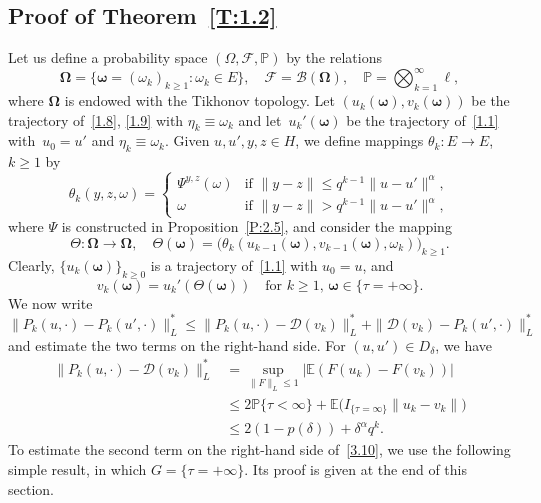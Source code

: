 \documentclass[11pt]{article}
\theoremstyle{plain}
\theoremstyle{definition}
\let\mathcal\mathscr
\theoremstyle{plain}
\numberwithin{equation}{section}
\newcommand{\IP}{{\mathbb P}}
\newcommand{\E}{{\mathbb E}}
\newcommand{\OOmega}{{\boldsymbol\Omega}}
\newcommand{\oomega}{{\boldsymbol\omega}}
\newcommand{\BB}{{\mathcal B}}
\newcommand{\DD}{{\mathcal D}}
\newcommand{\FF}{{\mathcal F}}
\begin{document}
\subsection{Proof of Theorem~\ref{T:1.2}}
\label{s3.2}
Let us define a probability space $(\Omega,\FF,\IP)$ by the relations\vspace*{-3pt}
\[
\OOmega=\{\oomega=(\omega_k)_{k\ge1}:\omega_k\in E\}, \quad
\FF=\BB(\OOmega),\quad \IP=\bigotimes_{k=1}^\infty\ell,
\]
where $\OOmega$ is endowed with the Tikhonov topology.
Let $(u_k(\oomega), v_k(\oomega))$ be the trajectory of~\eqref{1.8}, \eqref{1.9} with $\eta_k\equiv\omega_k$ and let~$u_k'(\oomega)$ be the trajectory of~\eqref{1.1} with~$u_0=u'$ and $\eta_k\equiv\omega_k$. Given $u,u',y,z\in H$, we define mappings $\theta_k:E\to E$, $k\ge1$ by\vspace*{-3pt}
\begin{equation} \label{3.08}
\theta_k(y,z,\omega)
=
\begin{cases}
\varPsi^{y,z}(\omega)
&\text{if } \|y-z\|
\le q^{k-1}\|u-u'\|^\alpha,\\[3pt]
\omega &\text{if } \|y-z\|
> q^{k-1}\|u-u'\|^\alpha,
\end{cases}
\end{equation}
where $\Psi$ is constructed in Proposition~\ref{P:2.5}, and consider the mapping
\[
\Theta:\OOmega\to\OOmega,\quad
\Theta(\oomega)
=\bigl(\theta_k(u_{k-1}(\oomega),v_{k-1}(\oomega),\omega_k)\bigr)_{k\ge1}.
\]
Clearly, $\{u_k(\oomega)\}_{k\ge0}$ is a trajectory of~\eqref{1.1} with $u_0=u$, and
\begin{equation} \label{3.09}
v_k(\oomega)=u_k'(\Theta(\oomega))\quad
\text{for $k\ge1$, $\oomega\in\{\tau=+\infty\}$}.
\end{equation}
We now write\vspace*{-3pt}
\begin{equation} \label{3.10}
\|P_k(u,\cdot)-P_k(u',\cdot)\|_L^*
\le \|P_k(u,\cdot)-\DD(v_k)\|_L^*+\|\DD(v_k)-P_k(u',\cdot)\|_L^*
\end{equation}
and estimate the two terms on the right-hand side. For $(u,u')\in D_\delta$, we have\vspace*{-3pt}
\begin{equation}\label{3.011}
\begin{aligned}
\|P_k(u,\cdot)-\DD(v_k)\|_L^*
&=\sup_{\|F\|_L\le1}\bigl|\E(F(u_k)-F(v_k))\bigr|\\
&\le2\IP\{\tau<\infty\}+\E\bigl(I_{\{\tau=\infty\}}\|u_k-v_k\|\bigr)\\
&\le 2(1-p(\delta))+\delta^\alpha q^{k}.
\end{aligned}
\end{equation}
To estimate the second term on the right-hand side of~\eqref{3.10}, we use the following simple result, in which $G=\{\tau=+\infty\}$. Its proof is given at the end of this section.
\end{document}
